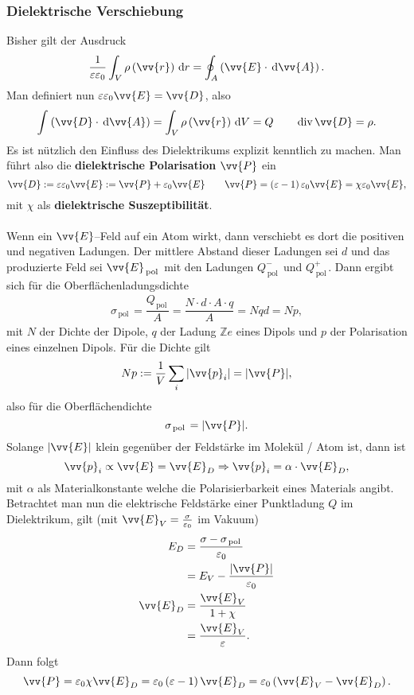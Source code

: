\documentclass[a4paper,12pt]{article}
\newcommand{\td}{\,\text{d}}
\begin{document}
\subsubsection{Dielektrische Verschiebung}
Bisher gilt der Ausdruck
\[ 
        \dfrac{1}{\varepsilon \varepsilon _0}\int_{V}^{}\rho \left(\vv{r}\right)\td r=\oint_{A}^{}\left(\vv{E}\cdot \td\vv{A}\right) 
.\] 
Man definiert nun $\varepsilon \varepsilon _0\vv{E}=\vv{D}$, also
\[ 
        \int_{}^{}\left(\vv{D}\cdot \td \vv{A}\right)=\int_{V}^{}\rho \left(\vv{r}\right)\td V=Q \qquad \,\text{div}\,\vv{D}=\rho 
.\] 
Es ist nützlich den Einfluss des Dielektrikums explizit kenntlich zu machen. Man führt also die \textbf{dielektrische Polarisation} $\vv{P}$ ein
\[ 
        \vv{D}:=\varepsilon \varepsilon _0\vv{E}:=\vv{P}+\varepsilon _0\vv{E}\qquad \vv{P}=\left(\varepsilon -1\right)\varepsilon _0\vv{E}=\chi \varepsilon _0\vv{E}
,\] 
mit $\chi$ als \textbf{dielektrische Suszeptibilität}.\\\\\indent
Wenn ein $\vv{E}$--Feld auf ein Atom wirkt, dann verschiebt es dort die positiven und negativen Ladungen. Der mittlere Abstand dieser Ladungen sei $d$ und das produzierte Feld sei $\vv{E}_{\,\text{pol}\,}$ mit den Ladungen $Q^-_{\,\text{pol}\,}$ und $Q^+_{\,\text{pol}\,}$. Dann ergibt sich für die Oberflächenladungsdichte
\begin{align*}
        \sigma _{\,\text{pol}\,}=\dfrac{Q_{\,\text{pol}\,}}{A}=\dfrac{N\cdot d\cdot A\cdot q}{A}=Nqd=Np
,\end{align*}
mit $N$ der Dichte der Dipole, $q$ der Ladung $\mathbb{Z}e$ eines Dipols und $p$ der Polarisation eines einzelnen Dipols. Für die Dichte gilt
\[ 
        Np:=\dfrac{1}{V}\sum_{i}^{}|\vv{p}_i|=|\vv{P}|
,\] 
also für die Oberflächendichte
\[ 
        \sigma _{\,\text{pol}\,}=|\vv{P}|
.\] 
Solange $|\vv{E}|$ klein gegenüber der Feldstärke im Molekül / Atom ist, dann ist
\[ 
        \vv{p}_i\propto \vv{E}=\vv{E}_D\Rightarrow \vv{p}_i=\alpha \cdot \vv{E}_D
,\] 
mit $\alpha $ als Materialkonstante welche die Polarisierbarkeit eines Materials angibt.\\\indent
Betrachtet man nun die elektrische Feldstärke einer Punktladung $Q$ im Dielektrikum, gilt (mit $\vv{E}_V=\tfrac{\sigma }{\varepsilon _0}$ im Vakuum)
\begin{align*}
        E_D&=\dfrac{\sigma -\sigma _{\,\text{pol}\,}}{\varepsilon _0}\\
           &=E_V-\dfrac{|\vv{P}|}{\varepsilon _0}\\
        \vv{E}_D&=\dfrac{\vv{E}_V}{1+\chi}\\
                &=\dfrac{\vv{E}_V}{\varepsilon }
.\end{align*}
Dann folgt
\[ 
        \vv{P}=\varepsilon _0\chi\vv{E}_D=\varepsilon _0\left(\varepsilon -1\right)\vv{E}_D=\varepsilon _0\left(\vv{E}_V-\vv{E}_D\right)
.\] 
\end{document}
